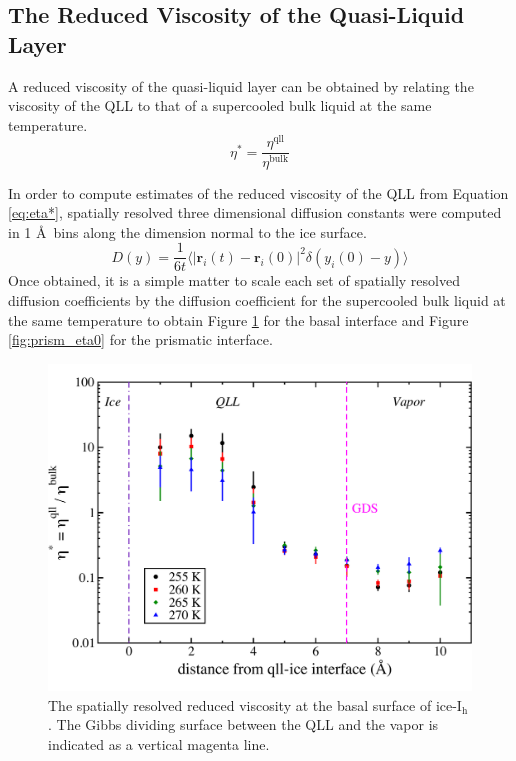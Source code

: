 \subsection{The Reduced Viscosity of the Quasi-Liquid Layer}
A reduced viscosity of the quasi-liquid layer can be obtained by
relating the viscosity of the QLL to that of a supercooled bulk
liquid at the same temperature.
\begin{equation}\label{eq:eta*}
\eta^* = \frac{\eta^{\mathrm{qll}}}{\eta^{\mathrm{bulk}}}
\end{equation}

In order to compute estimates of the reduced viscosity of the QLL from
Equation \eqref{eq:eta*}, spatially resolved three dimensional
diffusion constants were computed in 1 \AA~bins along the dimension
normal to the ice surface.
\begin{equation}\label{eq:yDiff}
D(y) = \frac{1}{6t} \langle | \mathbf{r}_i(t) - \mathbf{r}_i(0) |^2
\delta(y_i(0) - y)  \rangle 
\end{equation}
Once obtained, it is a simple matter to scale each set of spatially
resolved diffusion coefficients by the diffusion coefficient for the
supercooled bulk liquid at the same temperature to obtain Figure
\ref{fig:basal_eta0} for the basal interface and Figure
\ref{fig:prism_eta0} for the prismatic interface. 

\begin{figure}
\includegraphics[width=\linewidth]{Figures/basal_eta0}
\caption{\label{fig:basal_eta0}The spatially resolved reduced
  viscosity at the basal surface of ice-I$_\mathrm{h}$. The Gibbs
  dividing surface between the QLL and the vapor is indicated as a
  vertical magenta line.}
\end{figure}                

